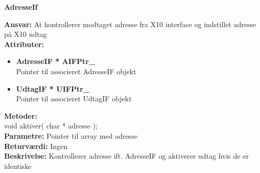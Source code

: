 %
%
{\centering
\textbf{AdresseIf}\par
}
\textbf{Ansvar:} At kontrollerer modtaget adresse fra X10 interface og indstillet adresse på X10 udtag \\
\textbf{Attributer:}
\begin{itemize}
	\item \textbf{AdresseIF * AIFPtr\_} \\
	Pointer til associeret AdresseIF objekt
	\item \textbf{UdtagIF * UIFPtr\_} \\
	Pointer til associeret UdtagIF objekt
\end{itemize}
\textbf{Metoder:} \\
void aktiver( char * adresse ); \\
\textbf{Parametre:} Pointer til array med adresse \\
\textbf{Returværdi:} Ingen \\
\textbf{Beskrivelse:} Kontrollerer adresse ift. AdresseIF og aktiverer udtag hvis de er identiske \\


